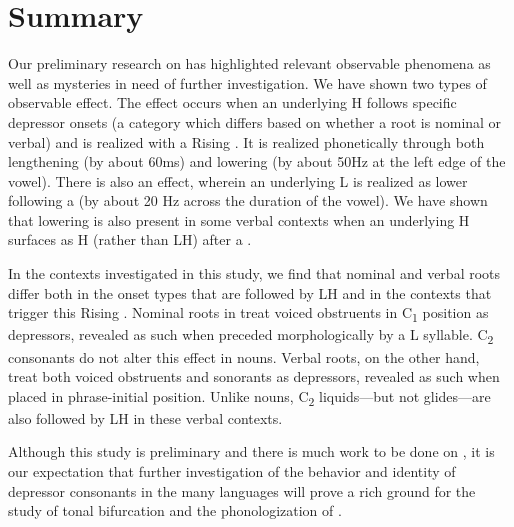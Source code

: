 \documentclass[output=paper
,newtxmath
,modfonts
,nonflat]{langsci/langscibook}
\begin{document}
\section{Summary}\label{sec:lotven:5}

Our preliminary research on  has highlighted relevant observable phenomena as well as mysteries in need of further investigation. We have shown two types of observable effect. The  effect occurs when an underlying H follows specific depressor onsets (a category which differs based on whether a root is nominal or verbal) and is realized with a Rising . It is realized phonetically through both lengthening (by about 60ms) and  lowering (by about 50Hz at the left edge of the vowel). There is also an   effect, wherein an underlying L is realized as lower following a  (by about 20 Hz across the duration of the vowel). We have shown that   lowering is also present in some verbal contexts when an underlying H surfaces as H (rather than LH) after a . 

In the contexts investigated in this study, we find that nominal and verbal roots differ both in the onset types that are followed by LH and in the contexts that trigger this Rising . Nominal roots in  treat voiced obstruents in C\textsubscript{1} position as depressors, revealed as such when preceded morphologically by a L  syllable. C\textsubscript{2} consonants do not alter this effect in nouns. Verbal roots, on the other hand, treat both voiced obstruents and sonorants as depressors, revealed as such when placed in phrase-initial position. Unlike nouns, C\textsubscript{2} liquids—but not glides—are also followed by LH in these verbal contexts. 

Although this study is preliminary and there is much work to be done on , it is our expectation that further investigation of the behavior and identity of depressor consonants in the many  languages will prove a rich ground for the study of tonal bifurcation and the phonologization of .



\end{document}

